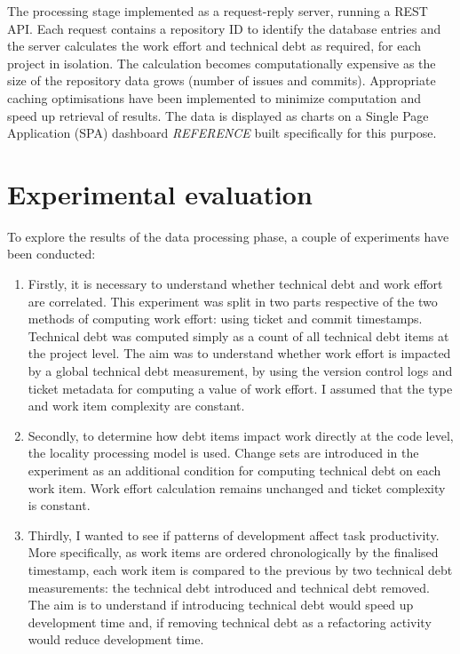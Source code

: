 \documentclass{mpaper}
\begin{document}
The processing stage  implemented as a request-reply server, running a REST API.
Each request contains a repository ID to identify the database entries and the
server calculates the work effort and technical debt as required, for each
project in isolation. The calculation becomes computationally expensive as the
size of the repository data grows (number of issues and commits). Appropriate
caching optimisations have been implemented to minimize computation and speed up
retrieval of results. The data is displayed as charts on a Single Page
Application (SPA) dashboard \emph{REFERENCE} built specifically for this
purpose. 

\section{Experimental evaluation}
\label{evaluation}

To explore the results of the data processing phase, a couple of experiments
have been conducted:

\begin{enumerate}
  
  \item Firstly, it is necessary to understand whether technical debt and work
  effort are correlated. This experiment was split in two parts respective of
  the two methods of computing work effort: using ticket and commit timestamps.
  Technical debt was computed simply as a count of all technical debt items at
  the project level. The aim was to understand whether work effort is impacted
  by a global technical debt measurement, by using the version control logs and
  ticket metadata for computing a value of work effort. I assumed that the type
  and work item complexity are constant.

  \item Secondly, to determine how debt items impact work directly at the code
  level, the locality processing model is used. Change sets are introduced in
  the experiment as an additional condition for computing technical debt on each
  work item. Work effort calculation remains unchanged and ticket complexity is
  constant.
  
  \item Thirdly, I wanted to see if patterns of development affect task
  productivity. More specifically, as work items are ordered chronologically by
  the finalised timestamp, each work item is compared to the previous by two
  technical debt measurements: the technical debt introduced and technical debt
  removed. The aim is to understand if introducing technical debt would speed up
  development time and, if removing technical debt as a refactoring activity
  would reduce development time.  
\end{enumerate}
\end{document}
